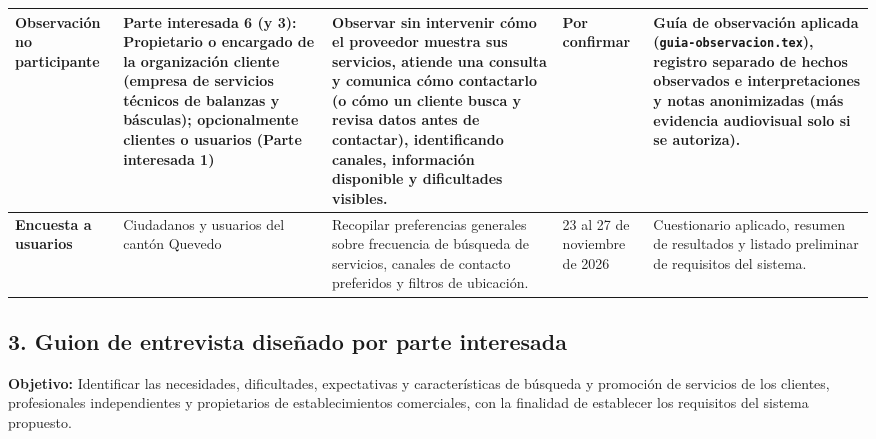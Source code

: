 \documentclass[11pt,a4paper]{article}
\begin{document}
\begin{table}[H]
\begin{tabularx}{\textwidth}{|L{2.7cm}|L{3.1cm}|Y|C{2.2cm}|L{3.2cm}|}
\hline
\textbf{Observaci\'on no participante} & \textbf{Parte interesada 6 (y 3):} Propietario o encargado de la organizaci\'on cliente (empresa de servicios t\'ecnicos de balanzas y b\'asculas); opcionalmente clientes o usuarios (Parte interesada 1) & Observar sin intervenir c\'omo el proveedor muestra sus servicios, atiende una consulta y comunica c\'omo contactarlo (o c\'omo un cliente busca y revisa datos antes de contactar), identificando canales, informaci\'on disponible y dificultades visibles. & Por confirmar & Gu\'ia de observaci\'on aplicada (\texttt{guia-\allowbreak observacion.tex}), registro separado de hechos observados e interpretaciones y notas anonimizadas (m\'as evidencia audiovisual solo si se autoriza). \\
\hline
\textbf{Encuesta a usuarios} & Ciudadanos y usuarios del cant\'on Quevedo & Recopilar preferencias generales sobre frecuencia de b\'usqueda de servicios, canales de contacto preferidos y filtros de ubicaci\'on. & 23 al 27 de noviembre de 2026 & Cuestionario aplicado, resumen de resultados y listado preliminar de requisitos del sistema. \\
\hline
\end{tabularx}
\end{table}

\subsection*{3. Guion de entrevista dise\~nado por parte interesada}

\textbf{Objetivo:} Identificar las necesidades, dificultades, expectativas y caracter\'isticas de b\'usqueda y promoci\'on de servicios de los clientes, profesionales independientes y propietarios de establecimientos comerciales, con la finalidad de establecer los requisitos del sistema propuesto.
\end{document}
